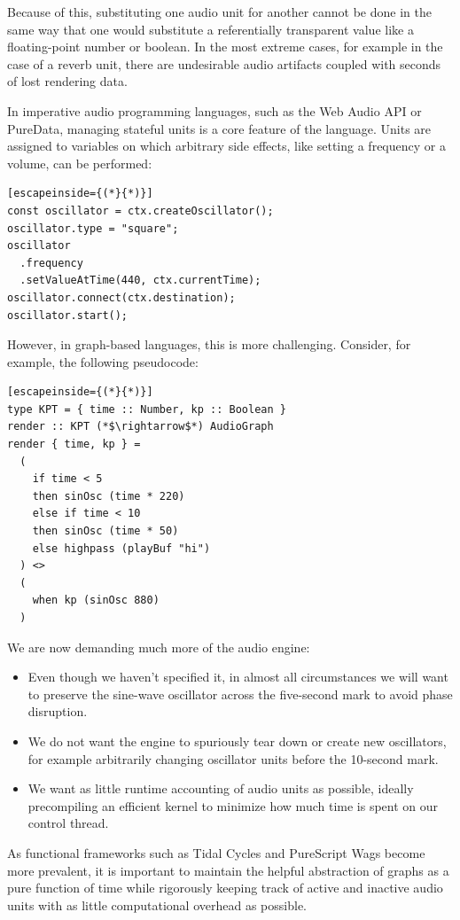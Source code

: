 \documentclass{article}
\begin{document}
Because of this, substituting one audio unit for another cannot be done in the same way that one would substitute a referentially transparent value like a floating-point number or boolean. In the most extreme cases, for example in the case of a reverb unit, there are undesirable audio artifacts coupled with seconds of lost rendering data.

In imperative audio programming languages, such as the Web Audio API or PureData, managing stateful units is a core feature of the language. Units are assigned to variables on which arbitrary side effects, like setting a frequency or a volume, can be performed:

\lstset{language=Java, style=psstyle}
\begin{lstlisting}[escapeinside={(*}{*)}]
const oscillator = ctx.createOscillator();
oscillator.type = "square";
oscillator
  .frequency
  .setValueAtTime(440, ctx.currentTime);
oscillator.connect(ctx.destination);
oscillator.start();
\end{lstlisting}

However, in graph-based languages, this is more challenging. Consider, for example, the following pseudocode:

\lstset{language=Haskell, style=psstyle}
\begin{lstlisting}[escapeinside={(*}{*)}]
type KPT = { time :: Number, kp :: Boolean }
render :: KPT (*$\rightarrow$*) AudioGraph
render { time, kp } =
  (
    if time < 5
    then sinOsc (time * 220)
    else if time < 10
    then sinOsc (time * 50)
    else highpass (playBuf "hi")
  ) <>
  (
    when kp (sinOsc 880)
  )
\end{lstlisting}

We are now demanding much more of the audio engine:
\begin{itemize}
\item Even though we haven't specified it, in almost all circumstances we will want to preserve the sine-wave oscillator across the five-second mark to avoid phase disruption.
\item We do not want the engine to spuriously tear down or create new oscillators, for example arbitrarily changing oscillator units before the 10-second mark.
\item We want as little runtime accounting of audio units as possible, ideally precompiling an efficient kernel to minimize how much time is spent on our control thread.
\end{itemize}

As functional frameworks such as Tidal Cycles and PureScript Wags become more prevalent, it is important to maintain the helpful abstraction of graphs as a pure function of time while rigorously keeping track of active and inactive audio units with as little computational overhead as possible.
\end{document}
